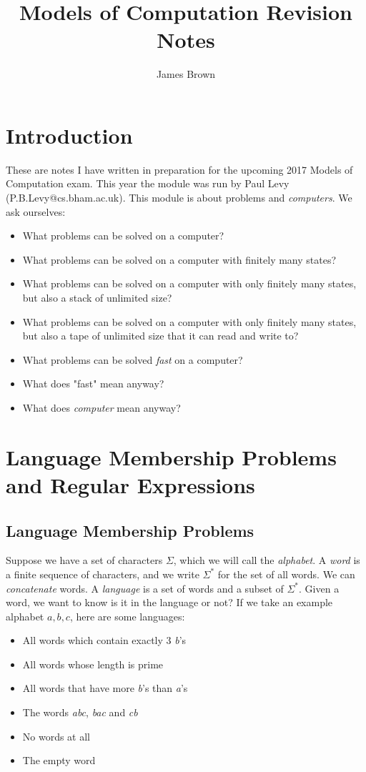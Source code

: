 \documentclass[11pt]{article}
\title{Models of Computation \linebreak Revision Notes}
\author{James Brown}
\begin{document}
	\maketitle
	\newpage
	\tableofcontents
	\newpage
	
	\section{Introduction}
	These are notes I have written in preparation for the upcoming 2017 Models of Computation exam. This year the module was run by Paul Levy (P.B.Levy@cs.bham.ac.uk).
	\linebreak	
	This module is about problems and \textit{computers}. We ask ourselves:
	\begin{itemize}
		\item What problems can be solved on a computer?
		\item What problems can be solved on a computer with finitely many states?
		\item What problems can be solved on a computer with only finitely many states, but also a stack of unlimited size?
		\item What problems can be solved on a computer with only finitely many states, but also a tape of unlimited size that it can read and write to?
		\item What problems can be solved \textit{fast} on a computer?
		\item What does "fast" mean anyway?
		\item What does \textit{computer} mean anyway?
	\end{itemize}
	
	\section{Language Membership Problems and Regular Expressions}
	\subsection{Language Membership Problems}
	Suppose we have a set of characters $\Sigma$, which we will call the \textit{alphabet}. A \textit{word} is a finite sequence of characters, and we write $\Sigma^{*}$ for the set of all words. We can \textit{concatenate} words. A \textit{language} is a set of words and a subset of $\Sigma^{*}$. Given a word, we want to know is it in the language or not? If we take an example alphabet ${a, b, c}$, here are some languages:
	\begin{itemize}
		\item All words which contain exactly 3 \textit{b}'s
		\item All words whose length is prime
		\item All words that have more \textit{b}'s than \textit{a}'s
		\item The words \textit{abc}, \textit{bac} and \textit{cb}
		\item No words at all
		\item The empty word
	\end{itemize}
	
\end{document}
